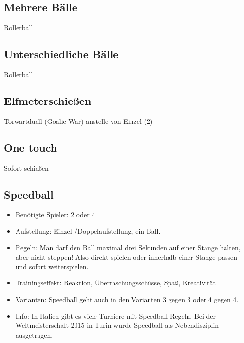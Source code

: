 \subsection{Mehrere Bälle}
\label{spielformen:sonderregeln:unterschiedlichebaelle}
Rollerball

\subsection{Unterschiedliche Bälle}
\label{spielformen:sonderregeln:mehrerebaelle}
Rollerball


\subsection{Elfmeterschießen}
\label{spielformen:sonderregeln:elfemeter}
Torwartduell (Goalie War) anstelle von Einzel (2)

\subsection{One touch}
\label{spielformen:sonderregeln:onetouch}
Sofort schießen

\subsection{Speedball}
\label{spielformen:sonderregeln:speedball}

\begin{itemize}
\item Benötigte Spieler: 2 oder 4 
\item Aufstellung: Einzel-/Doppelaufstellung, ein Ball.
\item Regeln: Man darf den Ball maximal drei Sekunden auf einer Stange halten, aber
nicht stoppen! Also direkt spielen oder innerhalb einer Stange passen und sofort
weiterspielen.
\item Trainingseffekt: Reaktion, Überraschungsschüsse, Spaß, Kreativität
\item Varianten: Speedball geht auch in den Varianten 3 gegen 3 oder 4 gegen 4.  
\item Info: In Italien gibt es viele Turniere mit Speedball-Regeln. Bei der Weltmeisterschaft 2015 in Turin wurde Speedball als Nebendisziplin ausgetragen. 
\end{itemize}

